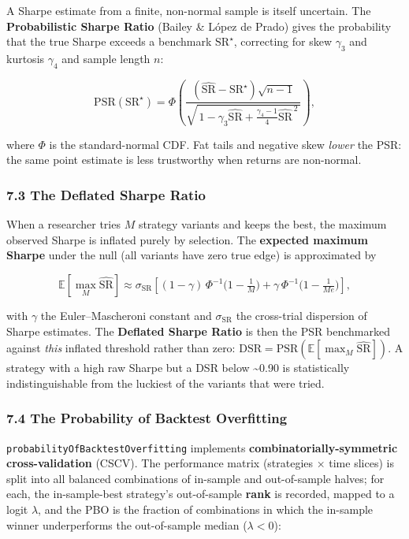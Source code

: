 \documentclass[
  11pt,
]{article}
\begin{document}
A Sharpe estimate from a finite, non-normal sample is itself uncertain.
The \textbf{Probabilistic Sharpe Ratio} (Bailey \& López de Prado) gives
the probability that the true Sharpe exceeds a benchmark
\(\text{SR}^\star\), correcting for skew \(\gamma_3\) and kurtosis
\(\gamma_4\) and sample length \(n\):

\[
\text{PSR}(\text{SR}^\star) = \Phi\!\left(
\frac{(\widehat{\text{SR}} - \text{SR}^\star)\sqrt{n-1}}
     {\sqrt{\,1 - \gamma_3\widehat{\text{SR}} + \tfrac{\gamma_4-1}{4}\widehat{\text{SR}}^{\,2}\,}}
\right),
\]

where \(\Phi\) is the standard-normal CDF. Fat tails and negative skew
\emph{lower} the PSR: the same point estimate is less trustworthy when
returns are non-normal.

\subsubsection{7.3 The Deflated Sharpe
Ratio}\label{the-deflated-sharpe-ratio}

When a researcher tries \(M\) strategy variants and keeps the best, the
maximum observed Sharpe is inflated purely by selection. The
\textbf{expected maximum Sharpe} under the null (all variants have zero
true edge) is approximated by

\[
\mathbb{E}[\max_M \widehat{\text{SR}}] \approx \sigma_{\text{SR}}\left[(1-\gamma)\,\Phi^{-1}\!\Big(1-\tfrac{1}{M}\Big) + \gamma\,\Phi^{-1}\!\Big(1-\tfrac{1}{Me}\Big)\right],
\]

with \(\gamma\) the Euler--Mascheroni constant and
\(\sigma_{\text{SR}}\) the cross-trial dispersion of Sharpe estimates.
The \textbf{Deflated Sharpe Ratio} is then the PSR benchmarked against
\emph{this} inflated threshold rather than zero:
\(\text{DSR} = \text{PSR}(\mathbb{E}[\max_M \widehat{\text{SR}}])\). A
strategy with a high raw Sharpe but a DSR below \textasciitilde0.90 is
statistically indistinguishable from the luckiest of the variants that
were tried.

\subsubsection{7.4 The Probability of Backtest
Overfitting}\label{the-probability-of-backtest-overfitting}

\texttt{probabilityOfBacktestOverfitting} implements
\textbf{combinatorially-symmetric cross-validation} (CSCV). The
performance matrix (strategies × time slices) is split into all balanced
combinations of in-sample and out-of-sample halves; for each, the
in-sample-best strategy's out-of-sample \textbf{rank} is recorded,
mapped to a logit \(\lambda\), and the PBO is the fraction of
combinations in which the in-sample winner underperforms the
out-of-sample median (\(\lambda < 0\)):
\end{document}
